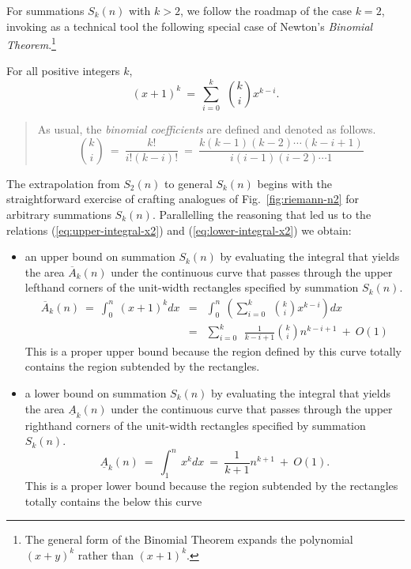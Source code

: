\medskip

For summations $S_k(n)$ with $k >2$, we follow the roadmap of the case
$k=2$, invoking as a technical tool the following special case of
Newton's {\it Binomial Theorem}.\footnote{The general form of the
  Binomial Theorem expands the polynomial $(x+y)^k$ rather than
  $(x+1)^k$.}

\begin{theorem}
\label{thm:restricted-binomial-thm}
For all positive integers $k$,
\[ (x+1)^k \ = \
\sum_{i=0}^k \ \ {k \choose i} x^{k-i}.
\]
\end{theorem}

\begin{quote}
As usual, the {\it binomial coefficients} are defined and denoted as
follows.
\[
{k \choose i} \ = \ \frac{k!}{i!(k-i)!} \ = \
\frac{k(k-1)(k-2) \cdots (k-i+1)}{i(i-1)(i-2) \cdots 1}
\]
\end{quote}

The extrapolation from $S_2(n)$ to general $S_k(n)$ begins with the
straightforward exercise of crafting analogues of
Fig.~\ref{fig:riemann-n2} for arbitrary summations $S_k(n)$.
Parallelling the reasoning that led us to the relations
(\ref{eq:upper-integral-x2}) and (\ref{eq:lower-integral-x2}) we
obtain:
\begin{itemize}
\item
an upper bound on summation $S_k(n)$ by evaluating the integral that
yields the area $\overline{A}_k(n)$ under the continuous curve that
passes through the upper lefthand corners of the unit-width rectangles
specified by summation $S_k(n)$.
\begin{eqnarray}
\label{eq:upper-integral-xk}
\overline{A}_k(n) \ = \
\int_0^n \ (x+1)^k dx & = &
\int_0^n \ \left(
\sum_{i=0}^k \ \ {k \choose i} x^{k-i} \right) dx \\
\nonumber
  & = &
\sum_{i=0}^k \ \ \frac{1}{k-i+1} {k \choose i} n^{k-i+1} \ + \ O(1)
\end{eqnarray}
This is a proper upper bound because the region defined by this curve
totally contains the region subtended by the rectangles.

\item
a lower bound on summation $S_k(n)$ by evaluating the integral that
yields the area $\underline{A}_k(n)$ under the continuous curve that
passes through the upper righthand corners of the unit-width
rectangles specified by summation $S_k(n)$.
\begin{equation}
\label{eq:lower-integral-xk}
\underline{A}_k(n) \ = \ 
\int_1^n \ x^k dx \ = \ \frac{1}{k+1} n^{k+1} \ + \ O(1).
\end{equation}
This is a proper lower bound because the region subtended by the
rectangles totally contains the below this curve
\end{itemize}

